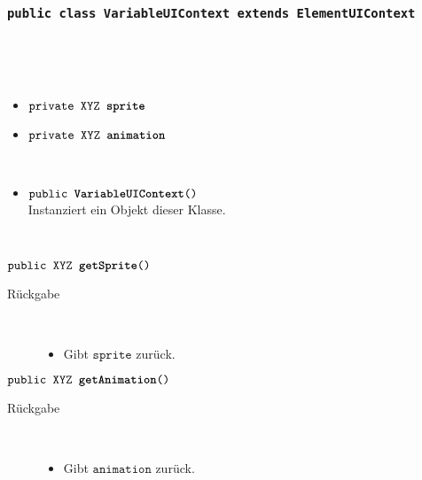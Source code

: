 		\subsubsection{\normalfont \texttt{public class \textbf{VariableUIContext} extends ElementUIContext}}

\begin{description}
\item[Beschreibung] \hfill \\ 
\item[Attribute] \hfill \\
	\vspace{-.8cm}
	\begin{itemize}	
		\item $\texttt{private XYZ \textbf{sprite}}$ \\ 		
		\item $\texttt{private XYZ \textbf{animation}}$ \\ 
		\end{itemize}
	
\item[Konstruktoren] \hfill \\
	\vspace{-.8cm}
	\begin{itemize}
		\item $\texttt{public \textbf{VariableUIContext}()}$ \\ Instanziert ein Objekt dieser Klasse.

	\end{itemize}
	
\item[Methoden] \hfill \\
	\vspace{-.8cm}
		\item $\texttt{public XYZ \textbf{getSprite}()}$ \\ 
		\begin{description}
			\item[Rückgabe] \hfill \\
			\vspace{-.8cm}
			\begin{itemize}
				\item Gibt $\texttt{sprite}$ zurück.
			\end{itemize}
			\end{description}
			
		\item $\texttt{public XYZ \textbf{getAnimation}()}$ \\ 
		\begin{description}
			\item[Rückgabe] \hfill \\
			\vspace{-.8cm}
			\begin{itemize}
				\item Gibt $\texttt{animation}$ zurück.
			\end{itemize}
			\end{description}
			
			

	\end{description}
			
